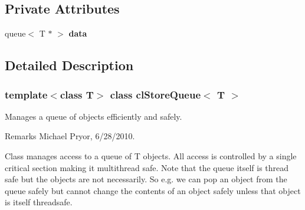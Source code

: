 \subsection*{Private Attributes}
\begin{DoxyCompactItemize}
\item 
\hypertarget{classcl_store_queue_ae5b85634b4b8e293ab7517939d97202b}{
queue$<$ T $\ast$ $>$ {\bfseries data}}
\label{classcl_store_queue_ae5b85634b4b8e293ab7517939d97202b}

\end{DoxyCompactItemize}


\subsection{Detailed Description}
\subsubsection*{template$<$class T$>$ class clStoreQueue$<$ T $>$}

Manages a queue of objects efficiently and safely. \begin{DoxyRemark}{Remarks}
Michael Pryor, 6/28/2010.
\end{DoxyRemark}
Class manages access to a queue of T objects. All access is controlled by a single critical section making it multithread safe. Note that the queue itself is thread safe but the objects are not necessarily. So e.g. we can pop an object from the queue safely but cannot change the contents of an object safely unless that object is itself threadsafe. 

